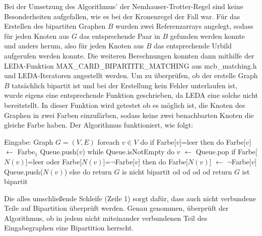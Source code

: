 Bei der Umsetzung des Algorithmus' der Nemhauser-Trotter-Regel sind keine Besonderheiten aufgefallen, wie es bei der Kronenregel der Fall war. Für das Erstellen des bipartiten Graphen $B$ wurden zwei Referenzarrays angelegt, sodass für jeden Knoten aus $G$ das entsprechende Paar in $B$ gefunden werden konnte und anders herum, also für jeden Knoten aus $B$ das entsprechende Urbild aufgerufen werden konnte. Die weiteren Berechnungen konnten dann mithilfe der LEDA-Funktion MAX\_CARD\_BIPARTITE\_MATCHING aus mcb\_matching.h und LEDA-Iteratoren angestellt werden. Um zu überprüfen, ob der erstelle Graph $B$ tatsächlich bipartit ist und bei der Erstellung kein Fehler unterlaufen ist, wurde eigens eine entsprechende Funktion geschrieben, da LEDA eine solche nicht bereitstellt. In dieser Funktion wird getestet ob es möglich ist, die Knoten des Graphen in zwei Farben einzufärben, sodass keine zwei benachbarten Knoten die gleiche Farbe haben. Der Algorithmus funktioniert, wie folgt:
\begin{singlespace}
\begin{algorithm}[caption={Bipartit-Check}, label={alg4}]
Eingabe: Graph $G=(V,E)$ 
foreach $ v \in V$ do
  if Farbe[$v$]=leer then do
    Farbe[$v$] $\leftarrow$ Farbe$_{1}$    
    Queue.push($v$)
    while Queue.isNotEmpty do
      $v$ $\leftarrow$ Queue.pop
      if Farbe[$N(v)$]=leer oder Farbe[$N(v)$]=$\neg$Farbe[$v$] then do
        Farbe[$N(v)$] $\leftarrow$ $\neg$Farbe[$v$]
        Queue.push($N(v)$)
      else do
        return $G$ is nicht bipartit
      od 
    od
  od  
od
return $G$ ist bipartit
\end{algorithm}
\end{singlespace}
Die alles umschließende Schleife (Zeile 1) sorgt dafür, dass auch nicht verbundene Teile auf Bipartition überprüft werden. Genau genommen, überprüft der Algorithmus, ob in jedem nicht miteinander verbundenen Teil des Eingabegraphen eine Bipartition herrscht.





